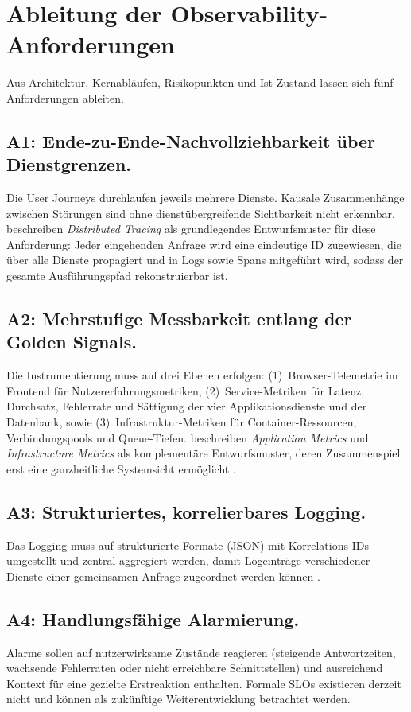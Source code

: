 \section{Ableitung der Observability-Anforderungen}

Aus Architektur, Kernabläufen, Risikopunkten und Ist-Zustand lassen sich fünf Anforderungen ableiten.

\subsection{A1: Ende-zu-Ende-Nachvollziehbarkeit über Dienstgrenzen.}
Die User Journeys durchlaufen jeweils mehrere Dienste. Kausale Zusammenhänge zwischen Störungen sind ohne dienstübergreifende Sichtbarkeit nicht erkennbar. \textcite[S.~6]{albuquerque2025tracing} beschreiben \emph{Distributed Tracing} als grundlegendes Entwurfsmuster für diese Anforderung: Jeder eingehenden Anfrage wird eine eindeutige ID zugewiesen, die über alle Dienste propagiert und in Logs sowie Spans mitgeführt wird, sodass der gesamte Ausführungspfad rekonstruierbar ist.

\subsection{A2: Mehrstufige Messbarkeit entlang der Golden Signals.}
Die Instrumentierung muss auf drei Ebenen erfolgen: (1)~Browser-Telemetrie im Frontend für Nutzererfahrungsmetriken, (2)~Service-Metriken für Latenz, Durchsatz, Fehlerrate und Sättigung der vier Applikationsdienste und der Datenbank, sowie (3)~Infrastruktur-Metriken für Container-Ressourcen, Verbindungspools und Queue-Tiefen. \textcite[S.~10, 16]{albuquerque2025tracing} beschreiben \emph{Application Metrics} und \emph{Infrastructure Metrics} als komplementäre Entwurfsmuster, deren Zusammenspiel erst eine ganzheitliche Systemsicht ermöglicht \parencite[S.~22]{albuquerque2025tracing}.

\subsection{A3: Strukturiertes, korrelierbares Logging.}
Das Logging muss auf strukturierte Formate (JSON) mit Korrelations-IDs umgestellt und zentral aggregiert werden, damit Logeinträge verschiedener Dienste einer gemeinsamen Anfrage zugeordnet werden können \parencite[S.~9--10]{albuquerque2025tracing}.

\subsection{A4: Handlungsfähige Alarmierung.}
Alarme sollen auf nutzerwirksame Zustände reagieren (steigende Antwortzeiten, wachsende Fehlerraten oder nicht erreichbare Schnittstellen) und ausreichend Kontext für eine gezielte Erstreaktion enthalten. Formale SLOs existieren derzeit nicht und können als zukünftige Weiterentwicklung betrachtet werden.

